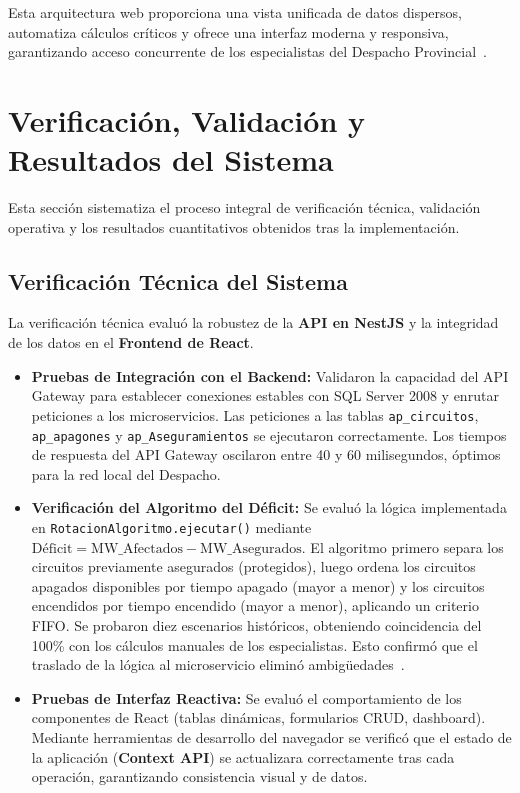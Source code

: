 Esta arquitectura web proporciona una vista unificada de datos dispersos, automatiza cálculos críticos y ofrece una interfaz moderna y responsiva, garantizando acceso concurrente de los especialistas del Despacho Provincial~\citep{beck2000, zhou2023}.

\section{Verificación, Validación y Resultados del Sistema}

Esta sección sistematiza el proceso integral de verificación técnica, validación operativa y los resultados cuantitativos obtenidos tras la implementación.

\subsection{Verificación Técnica del Sistema}

La verificación técnica evaluó la robustez de la \textbf{API en NestJS} y la integridad de los datos en el \textbf{Frontend de React}.

\begin{itemize}
    \item \textbf{Pruebas de Integración con el Backend:} Validaron la capacidad del API Gateway para establecer conexiones estables con SQL Server 2008 y enrutar peticiones a los microservicios. Las peticiones a las tablas \texttt{ap\_circuitos}, \texttt{ap\_apagones} y \texttt{ap\_Aseguramientos} se ejecutaron correctamente. Los tiempos de respuesta del API Gateway oscilaron entre 40 y 60 milisegundos, óptimos para la red local del Despacho.
    \item \textbf{Verificación del Algoritmo del Déficit:} Se evaluó la lógica implementada en \texttt{RotacionAlgoritmo.ejecutar()} mediante $\text{Déficit} = \text{MW\_Afectados} - \text{MW\_Asegurados}$. El algoritmo primero separa los circuitos previamente asegurados (protegidos), luego ordena los circuitos apagados disponibles por tiempo apagado (mayor a menor) y los circuitos encendidos por tiempo encendido (mayor a menor), aplicando un criterio FIFO. Se probaron diez escenarios históricos, obteniendo coincidencia del 100\% con los cálculos manuales de los especialistas. Esto confirmó que el traslado de la lógica al microservicio eliminó ambigüedades~\citep{gomez2016}.
    \item \textbf{Pruebas de Interfaz Reactiva:} Se evaluó el comportamiento de los componentes de React (tablas dinámicas, formularios CRUD, dashboard). Mediante herramientas de desarrollo del navegador se verificó que el estado de la aplicación (\textbf{Context API}) se actualizara correctamente tras cada operación, garantizando consistencia visual y de datos.
\end{itemize}

